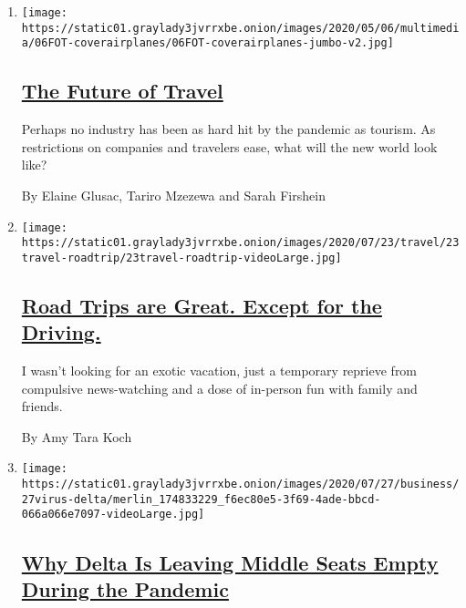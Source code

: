\begin{enumerate}
\def\labelenumi{\arabic{enumi}.}
\item
  \texttt{[image: https://static01.graylady3jvrrxbe.onion/images/2020/05/06/multimedia/06FOT-coverairplanes/06FOT-coverairplanes-jumbo-v2.jpg]}

  \hypertarget{the-future-of-travel}{%
  \subsection{\texorpdfstring{\href{/interactive/2020/05/06/travel/coronavirus-travel-questions.html}{The
  Future of Travel}}{The Future of Travel}}\label{the-future-of-travel}}

  Perhaps no industry has been as hard hit by the pandemic as tourism.
  As restrictions on companies and travelers ease, what will the new
  world look like?

  By Elaine Glusac, Tariro Mzezewa and Sarah Firshein
\item
  \texttt{[image: https://static01.graylady3jvrrxbe.onion/images/2020/07/23/travel/23travel-roadtrip/23travel-roadtrip-videoLarge.jpg]}

  \hypertarget{road-trips-are-great-except-for-the-driving}{%
  \subsection{\texorpdfstring{\href{/2020/07/24/travel/virus-road-trip.html}{Road
  Trips are Great. Except for the
  Driving.}}{Road Trips are Great. Except for the Driving.}}\label{road-trips-are-great-except-for-the-driving}}

  I wasn't looking for an exotic vacation, just a temporary reprieve
  from compulsive news-watching and a dose of in-person fun with family
  and friends.

  By Amy Tara Koch
\item
  \texttt{[image: https://static01.graylady3jvrrxbe.onion/images/2020/07/27/business/27virus-delta/merlin\_174833229\_f6ec80e5-3f69-4ade-bbcd-066a066e7097-videoLarge.jpg]}

  \hypertarget{why-delta-is-leaving-middle-seats-empty-during-the-pandemic}{%
  \subsection{\texorpdfstring{\href{/2020/07/27/business/delta-airlines-bill-lentsch.html}{Why
  Delta Is Leaving Middle Seats Empty During the
  Pandemic}}{Why Delta Is Leaving Middle Seats Empty During the Pandemic}}\label{why-delta-is-leaving-middle-seats-empty-during-the-pandemic}}


\end{enumerate}
